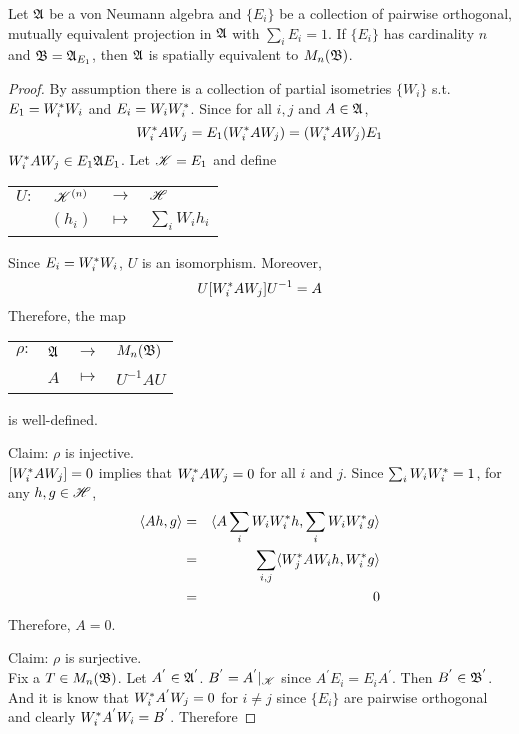 \begin{prop}
	Let $\mathfrak{A}$ be a von Neumann algebra and $\{E_i\}$ be a collection of pairwise orthogonal, mutually equivalent projection in $\mathfrak{A}$ with $\sum_i E_i = 1$. If $\{E_i\}$ has cardinality $n$ and $\mathfrak{B} = \mathfrak{A}_{E_1}$, then $\mathfrak{A}$ is spatially equivalent to $M_n(\mathfrak{B})$.
\end{prop}
\begin{proof}
	By assumption there is a collection of partial isometries $\{W_i\}$ s.t. $E_1 = W_i^{*}W_i$ and $E_i = W_iW_i^{*}$. Since for all $i,j$ and $A \in \mathfrak{A}$,
	\begin{equation*}
		W_i^{*}AW_j = E_1(W_i^{*}AW_j) = (W_i^{*}AW_j)E_1
	\end{equation*}
	$W_i^{*}AW_j \in E_1 \mathfrak{A} E_1$. Let $\mathscr{K} = E_1$ and define
	\begin{center}
		\begin{tabular}{l c c l}
			$U \colon$ & $\mathscr{K}^{(n)}$ & $\longrightarrow$ & $\mathscr{H}$ \\
			~ & $(h_i)$ & $\longmapsto$ & $\sum_i W_i h_i$
		\end{tabular}
	\end{center}
	Since $E_i = W_i^{*}W_i$, $U$ is an isomorphism. Moreover,
	\begin{equation*}
		U [W_i^{*}AW_j] U^{-1} = A
	\end{equation*}
	Therefore, the map
	\begin{center}
		\begin{tabular}{l c c l}
			$\rho \colon$ & $\mathfrak{A}$ & $\longrightarrow$ & $M_n(\mathfrak{B})$ \\
			~ & $A$ & $\longmapsto$ & $U^{-1} AU$
		\end{tabular}
	\end{center}
	is well-defined. 
	\item Claim: $\rho$ is injective. \\
	$[W_i^{*}AW_j] = 0$ implies that $W_i^{*}AW_j = 0$ for all $i$ and $j$. Since $\sum_i W_i W_i^{*} = 1$, for any $h,g \in \mathscr{H}$,
	\begin{eqnarray*}
		\langle Ah,g \rangle &=& \langle A \sum_i W_i W_i^{*} h, \sum_i W_i W_i^{*} g \rangle \\
		&=& \sum_{i,j} \langle W_j^{*}AW_i h, W_i^{*} g \rangle \\
		&=& 0
	\end{eqnarray*}
	Therefore, $A = 0$.
	\item Claim: $\rho$ is surjective. \\
	Fix a $T \in M_n(\mathfrak{B})$. Let $A^{'} \in \mathfrak{A}^{'}$. $B^{'} = A^{'}|_{\mathscr{K}}$ since $A^{'}E_i = E_iA^{'}$. Then $B^{'} \in \mathfrak{B}^{'}$. And it is know that $W_i^{*}A^{'}W_j = 0$ for $i \neq j$ since $\{E_i\}$ are pairwise orthogonal and clearly $W_i^{*}A^{'}W_i = B^{'}$. Therefore

\end{proof}

